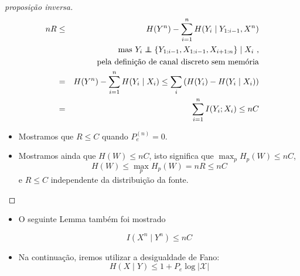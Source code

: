\begin{frame}[allowframebreaks]
\begin{proof}[proposição inversa]
  \proofbreak

	\begin{eqnarray} 
        nR &\leq& H(Y^n) - \sum_{i=1}^{n} H(Y_i \mid Y_{1:i-1}, X^n) \nonumber \\
		&& \text{mas $Y_i \independent \{ Y_{1:i-1}, X_{1:i-1}, X_{i+1:n} \} \mid X_i$ ,} \nonumber \\
		&& \text{pela definição de canal discreto sem memória} \nonumber \\
		&=& H(Y^n)  - \sum_{i=1}^{n} H(Y_i \mid X_i) \leq \sum_{i} \left( H(Y_i) - H(Y_i \mid X_i) \right) \nonumber \\
		&=& \sum_{i=1}^{n} I(Y_i;X_i) \leq nC
	 \end{eqnarray}

  \proofbreak

  \begin{itemize}
  \item Mostramos que $R \leq C$ quando $P_e^{(n)} = 0$.
  \item Mostramos ainda que $H(W) \leq nC$, isto significa que $\max_p H_p(W) \leq nC$,
	\begin{equation}
	H(W) \leq \max_p H_p(W) = nR \leq nC
	\end{equation}
	e $R \leq C$ independente da distribuição da fonte.
  \end{itemize}
  \end{proof}

  
  \framebreak
  \begin{itemize}
  \item O seguinte Lemma também foi mostrado
	\begin{lemma}
	\begin{equation}
	I(X^n \mid Y^n) \leq nC
	\end{equation}
	\end{lemma}
  \item Na continuação, iremos utilizar a desigualdade de Fano:
	\begin{equation}
	H(X \mid Y) \leq 1 + P_e \log \vert \mathcal{X} \vert
	\end{equation}
  \end{itemize}
 
  \framebreak
 

\end{frame}
